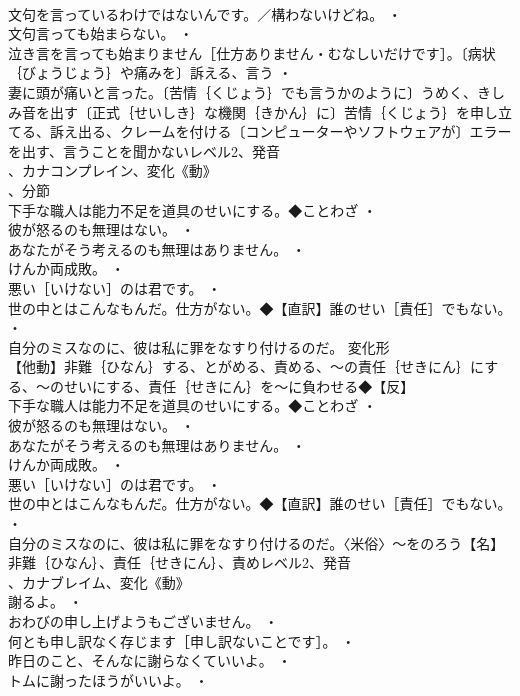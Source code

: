 \documentclass[8pt]{extreport}
\begin{document}
\begin{CJK}{UTF8}{min}
\\	文句を言っているわけではないんです。／構わないけどね。 ・
\\	文句言っても始まらない。 ・
\\	泣き言を言っても始まりません［仕方ありません・むなしいだけです］。〔病状｛びょうじょう｝や痛みを〕訴える、言う ・
\\	妻に頭が痛いと言った。〔苦情｛くじょう｝でも言うかのように〕うめく、きしみ音を出す〔正式｛せいしき｝な機関｛きかん｝に〕苦情｛くじょう｝を申し立てる、訴え出る、クレームを付ける〔コンピューターやソフトウェアが〕エラーを出す、言うことを聞かないレベル2、発音
\\	、カナコンプレイン、変化《動》
\\	、分節
\\	下手な職人は能力不足を道具のせいにする。◆ことわざ ・
\\	彼が怒るのも無理はない。 ・
\\	あなたがそう考えるのも無理はありません。 ・
\\	けんか両成敗。 ・
\\	悪い［いけない］のは君です。 ・
\\	世の中とはこんなもんだ。仕方がない。◆【直訳】誰のせい［責任］でもない。 ・
\\	自分のミスなのに、彼は私に罪をなすり付けるのだ。	変化形 
\\	【他動】非難｛ひなん｝する、とがめる、責める、～の責任｛せきにん｝にする、～のせいにする、責任｛せきにん｝を～に負わせる◆【反】
\\	下手な職人は能力不足を道具のせいにする。◆ことわざ ・
\\	彼が怒るのも無理はない。 ・
\\	あなたがそう考えるのも無理はありません。 ・
\\	けんか両成敗。 ・
\\	悪い［いけない］のは君です。 ・
\\	世の中とはこんなもんだ。仕方がない。◆【直訳】誰のせい［責任］でもない。 ・
\\	自分のミスなのに、彼は私に罪をなすり付けるのだ。〈米俗〉～をのろう【名】非難｛ひなん｝、責任｛せきにん｝、責めレベル2、発音
\\	、カナブレイム、変化《動》
\\	謝るよ。 ・
\\	おわびの申し上げようもございません。 ・
\\	何とも申し訳なく存じます［申し訳ないことです］。 ・
\\	昨日のこと、そんなに謝らなくていいよ。 ・
\\	トムに謝ったほうがいいよ。 ・

\end{CJK}
\end{document}
